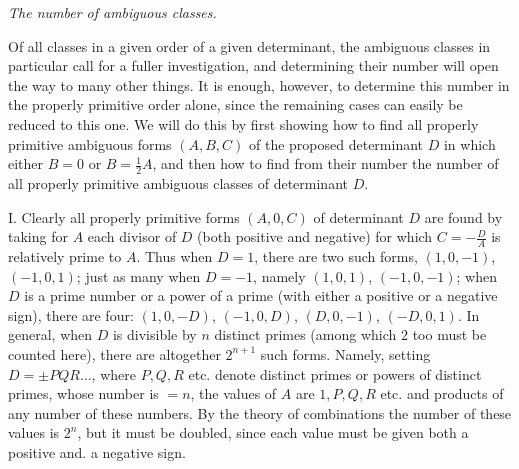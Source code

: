 \begin{center}
\textit{The number of ambiguous classes.}
\end{center}

Of all classes in a given order of a given determinant, the ambiguous classes in particular call for a fuller investigation, and determining their number will open the way to many other things. It is enough, however, to determine this number in the properly primitive order alone, since the remaining cases can easily be reduced to this one. We will do this by first showing how to find all properly primitive ambiguous forms \((A,B,C)\) of the proposed determinant \(D\) in which either \(B=0\) or \(B=\frac12 A\), and then how to find from their number the number of all properly primitive ambiguous classes of determinant \(D\).

I. Clearly all properly primitive forms \((A,0,C)\) of determinant \(D\) are found by taking for \(A\) each divisor of \(D\) (both positive and negative) for which \(C=-\frac{D}{A}\) is relatively prime to \(A\). Thus when \(D=1\), there are two such forms, \((1,0,-1)\), \((-1,0,1)\); just as many when \(D=-1\), namely \((1,0,1)\), \((-1,0,-1)\); when \(D\) is a prime number or a power of a prime (with either a positive or a negative sign), there are four: \((1,0,-D)\), \((-1,0,D)\), \((D,0,-1)\), \((-D,0,1)\). In general, when \(D\) is divisible by \(n\) distinct primes (among which \(2\) too must be counted here), there are altogether \(2^{n+1}\) such forms. Namely, setting \(D=\pm PQR\ldots\), where \(P,Q,R\) etc. denote distinct primes or powers of distinct primes, whose number is \(=n\), the values of \(A\) are \(1,P,Q,R\) etc. and products of any number of these numbers. By the theory of combinations the number of these values is \(2^n\), but it must be doubled, since each value must be given both a positive and. a negative sign.

